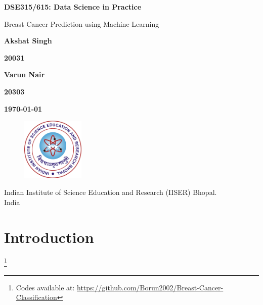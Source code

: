 \documentclass{article}
\begin{document}
\begin{titlepage}
   \begin{center}
       \vspace*{1cm}
        
        \Huge
        \textbf{DSE315/615: Data Science in Practice}

        \vspace{0.5cm}
        \huge
        Breast Cancer Prediction using Machine Learning
            
       \vspace{5cm}
        
        \Large
        \textbf{Akshat Singh}
        
        \textbf{20031}
        
        \vspace{0.5cm}
        
        \textbf{Varun Nair}
        
        \textbf{20303}
        
        \vspace{0.3cm}
        
        \textbf{\today}


        \vspace*{\fill}

        \begin{figure}[h]
            \centering
            \includegraphics[width = 3cm]{Base/IISERB Logo.png}       
        \end{figure}
        
        \Large
       Indian Institute of Science Education and Research (IISER) Bhopal.\\
        India\\
       
            
   \end{center}
\end{titlepage}

\section{Introduction}

\footnote{Codes available at: \href{https://github.com/Borun2002/Breast-Cancer-Classification}{https://github.com/Borun2002/Breast-Cancer-Classification}}
\end{document}
